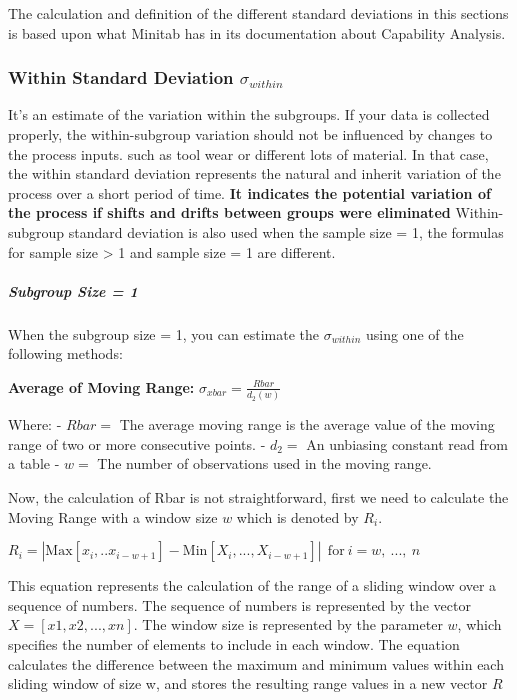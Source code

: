 \documentclass[11pt]{article}
\begin{document}
The calculation and definition of the different standard deviations in
this sections is based upon what Minitab has in its documentation about
Capability Analysis.

\hypertarget{within-standard-deviation-sigma_within}{%
\subsubsection{Within Standard Deviation \(\sigma_{within}\)}\label{within-standard-deviation-sigma_within}}

It's an estimate of the variation within the subgroups. If your data is
collected properly, the within-subgroup variation should not be
influenced by changes to the process inputs. such as tool wear or
different lots of material. In that case, the within standard deviation
represents the natural and inherit variation of the process over a short
period of time. \textbf{It indicates the potential variation of the
process if shifts and drifts between groups were eliminated}
Within-subgroup standard deviation is also used when the sample size =
1, the formulas for sample size \textgreater{} 1 and sample size = 1 are
different.

\hypertarget{subgroup-size-1}{%
\subparagraph{Subgroup Size = 1}\label{subgroup-size-1}}

When the subgroup size = 1, you can estimate the \(\sigma_{within}\)
using one of the following methods:

\textbf{Average of Moving Range:}
\(\sigma_{xbar} = \frac{Rbar}{d_2(w)}\)

Where: - \(Rbar =\) The average moving range is the average value of the
moving range of two or more consecutive points. - \(d_2 =\) An unbiasing
constant read from a table - \(w =\) The number of observations used in
the moving range.

Now, the calculation of Rbar is not straightforward, first we need to
calculate the Moving Range with a window size \(w\) which is denoted by
\(R_i\).

\(R_i = | \text{Max}[x_{i}, .. x_{i-w+1}] - \text{Min}[X_i, ..., X_{i-w+1}]| \ \ \text{for} \ i=w, \ ..., \ n\)

This equation represents the calculation of the range of a sliding
window over a sequence of numbers. The sequence of numbers is
represented by the vector \(X = [x1, x2, ..., xn]\). The window size is
represented by the parameter \(w\), which specifies the number of
elements to include in each window. The equation calculates the
difference between the maximum and minimum values within each sliding
window of size w, and stores the resulting range values in a new vector
\(R\)
\end{document}

